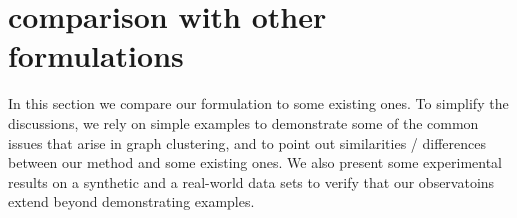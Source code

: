 \section{comparison with other formulations}
\label{sec:comparison-other}

In this section we compare our formulation to some existing ones. To simplify the discussions, we
rely on simple examples to demonstrate some of the common issues that arise in graph clustering, and
to point out similarities / differences between our method and some existing ones. We also present
some experimental results on a synthetic and a real-world data sets to verify that our observatoins
extend beyond demonstrating examples.



